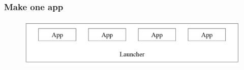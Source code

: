 \begin{frame}
	\begin{center}
		\frametitle{Make one app}
		\begin{figure}[H]
			\centering
			\includegraphics[width= 0.8 \textwidth]{pictures/NewLauncher.png}
		\end{figure}
	\end{center}
\end{frame}